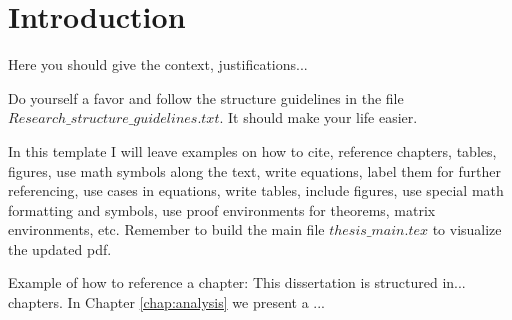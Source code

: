 \chapter{Introduction} \label{chap:intro}

Here you should give the context, justifications...

Do yourself a favor and follow the structure guidelines in the file $Research\_structure\_guidelines.txt$. It should make your life easier.

In this template I will leave examples on how to cite, reference chapters, tables, figures, use math symbols along the text, write equations, label them for further referencing, use cases in equations, write tables, include figures, use special math formatting and symbols, use proof environments for theorems, matrix environments, etc. Remember to build the main file $thesis\_main.tex$ to visualize the updated pdf.

Example of how to reference a chapter: This dissertation is structured in... chapters. In Chapter \ref{chap:analysis} we present a ...

